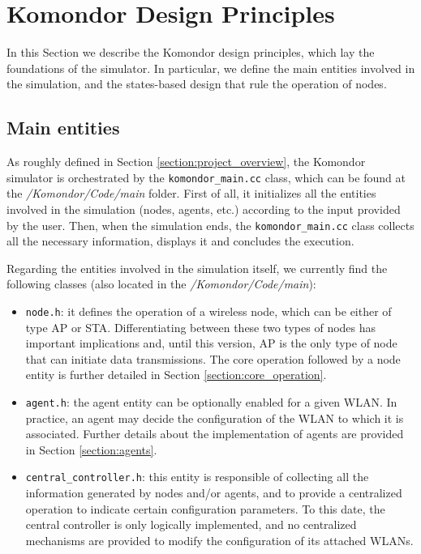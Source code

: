 \documentclass[a4paper]{article}
\begin{document}
\section{Komondor Design Principles}
\label{section:system_model}
In this Section we describe the Komondor design principles, which lay the foundations of the simulator. In particular, we define the main entities involved in the simulation, and the states-based design that rule the operation of nodes.

\subsection{Main entities}
\label{section:main_entities}
As roughly defined in Section \ref{section:project_overview}, the Komondor simulator is orchestrated by the \texttt{komondor\_main.cc} class, which can be found at the \textit{/Komondor/Code/main} folder. First of all, it initializes all the entities involved in the simulation (nodes, agents, etc.) according to the input provided by the user. Then, when the simulation ends, the \texttt{komondor\_main.cc} class collects all the necessary information, displays it and concludes the execution.

Regarding the entities involved in the simulation itself, we currently find the following classes (also located in the \textit{/Komondor/Code/main}):
\begin{itemize}
	\item \texttt{node.h}: it defines the operation of a wireless node, which can be either of type AP or STA. Differentiating between these two types of nodes has important implications and, until this version, AP is the only type of node that can initiate data transmissions. The core operation followed by a node entity is further detailed in Section \ref{section:core_operation}.
	\item \texttt{agent.h}: the agent entity can be optionally enabled for a given WLAN. In practice, an agent may decide the configuration of the WLAN to which it is associated. Further details about the implementation of agents are provided in Section \ref{section:agents}.
	\item \texttt{central\_controller.h}: this entity is responsible of collecting all the information generated by nodes and/or agents, and to provide a centralized operation to indicate certain configuration parameters. To this date, the central controller is only logically implemented, and no centralized mechanisms are provided to modify the configuration of its attached WLANs.
\end{itemize}
\end{document}

